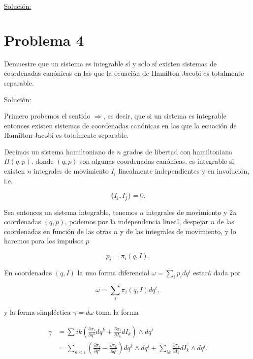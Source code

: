 \documentclass[a4paper,10pt]{article}
\numberwithin{equation}{section}
\begin{document}
\vspace{.3cm}

\underline{Solución:} \vspace{.3cm}

\section{Problema 4}

Demuestre que un sistema es integrable sí y solo sí existen sistemas de coordenadas 
canónicas en las que la ecuación de Hamilton-Jacobi es totalmente separable.

\vspace{.3cm}

\underline{Solución:} \vspace{.3cm}

Primero probemos el sentido $\Rightarrow$, es decir, que si un sistema es integrable 
entonces existen sistemas de coordenadas canónicas en las que la ecuación de 
Hamilton-Jacobi es totalmente separable.

\vspace{.3cm}

Decimos un sistema hamiltoniano de $n$ grados de libertad con hamiltoniana 
$H(q,p)$, donde $(q,p)$ son algunas coordenadas canónicas, es integrable si 
existen $n$ integrales de movimiento $I_i$ linealmente independientes y
en involución, i.e.

\begin{equation}
 \{ I_i, I_j \} = 0.
\end{equation}

Sea entonces un sistema integrable, tenemos $n$ integrales de movimiento y $2n$ coordenadas 
$(q,p)$, podemos por la independencia lineal, despejar $n$ de las coordenadas en 
función de las otras $n$ y de las integrales de movimiento, y lo haremos para 
los impulsos $p$ 

\begin{equation}
 p_i = \pi_i(q,I).
\end{equation}

En coordenadas $(q,I)$ la uno forma diferencial $\omega = \sum_i p_i dq^i$ estará 
dada por 

\begin{equation}
 \omega = \sum_i \pi_i(q,I)dq^i,
\end{equation}

y la forma simpléctica $\gamma = d\omega$ toma la forma 

\begin{align*}
 \gamma &= \sum{ik} \left(\frac{\partial \pi_i}{\partial q^k}dq^k + 
 \frac{\partial \pi_i}{\partial I_k}dI_k\right) \wedge dq^i \\
  &= \sum_{k<i} \left(\frac{\partial \pi_i}{\partial q^k} - 
 \frac{\partial \pi_k}{\partial q^i}\right) dq^k \wedge dq^i + 
 \sum_{ik} \frac{\partial \pi_i}{\partial I_k} dI_k \wedge dq^i.
\end{align*}
\end{document}
